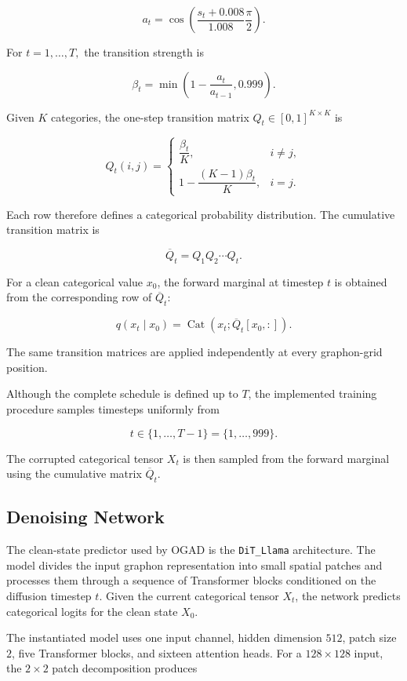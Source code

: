 \[
a_t
=
\cos
\left(
\frac{s_t+0.008}{1.008}
\frac{\pi}{2}
\right).
\]

For $t=1,\ldots,T,$ the transition strength is

\[
\beta_t
=
\min
\left(
1-\frac{a_t}{a_{t-1}},
0.999
\right).
\]

Given \(K\) categories, the one-step transition matrix $Q_t\in[0,1]^{K\times K}$ is

\[
Q_t(i,j)
=
\begin{cases}
\dfrac{\beta_t}{K},
&
i\neq j,
\\[6pt]
1-\dfrac{(K-1)\beta_t}{K},
&
i=j.
\end{cases}
\]

Each row therefore defines a categorical probability distribution. The cumulative transition matrix is

\[
\overline{Q}_t
=
Q_1Q_2\cdots Q_t.
\]

For a clean categorical value \(x_0\), the forward marginal at timestep \(t\) is obtained from the corresponding row of \(\overline{Q}_t\):

\[
q(x_t\mid x_0)
=
\operatorname{Cat}
\left(
x_t;
\overline{Q}_t[x_0,:]
\right).
\]

The same transition matrices are applied independently at every graphon-grid position.

Although the complete schedule is defined up to \(T\), the implemented training procedure samples timesteps uniformly from

\[
t\in\{1,\ldots,T-1\}
=
\{1,\ldots,999\}.
\]

The corrupted categorical tensor \(X_t\) is then sampled from the forward marginal using the cumulative matrix \(\overline{Q}_t\).


\subsection{Denoising Network}
\label{subsec:method_d3pm_network}

The clean-state predictor used by OGAD is the \texttt{DiT\_Llama} architecture. The model divides the input graphon representation into small spatial patches and processes them through a sequence of Transformer blocks conditioned on the diffusion timestep \(t\). Given the current categorical tensor \(X_t\), the network predicts categorical logits for the clean state \(X_0\).

The instantiated model uses one input channel, hidden dimension \(512\), patch size \(2\), five Transformer blocks, and sixteen attention heads. For a \(128\times128\) input, the \(2\times2\) patch decomposition produces

